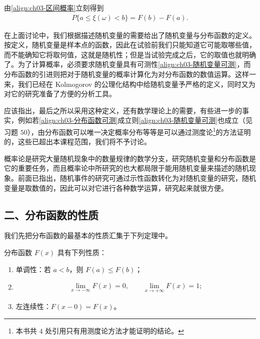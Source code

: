 \documentclass[../../main.tex]{subfiles}
\begin{document}
由\eqref{align:ch03-区间概率}立刻得到
\begin{align}
P\{a\leqslant\xi(\omega)<b\}=F(b)-F(a).\label{align:ch03-区间概率差}
\end{align}

在上面讨论中，我们根据描述随机变量的需要给出了随机变量与分布函数的定义。按定义，随机变量是样本点的函数，因此在试验前我们只能知道它可能取哪些值，而不能确知它将取何值，这就是随机性；但是当试验完成之后，它的取值也就明确了。为了计算概率，必须要求随机变量具有可测性\eqref{align:ch03-随机变量可测}，而分布函数的引进则把对于随机变量的概率计算化为对分布函数的数值运算。这样一来，我们已经在 Kolmogorov 的公理化结构中给随机变量予严格的定义，同时又为对它的研究准备了方便的分析工具。

应该指出，最后之所以采用这种定义，还有数学理论上的需要，有些进一步的事实，例如若\eqref{align:ch03-分布函数可测}成立则\eqref{align:ch03-随机变量可测}也成立（见习题 $50$），由分布函数可以唯一决定概率分布等等是可以通过测度论\footnote{本书共 $4$ 处引用只有用测度论方法才能证明的结论。}的方法证明的，这些已超出本课程范围，我们将不予讨论。

概率论是研究大量随机现象中的数量规律的数学分支，研究随机变量和分布函数是它的重要任务，而且概率论中所研究的也大都局限于能用随机变量来描述的随机现象。前面已指出，随机事件的研究可通过示性函数转化为对随机变量的研究，随机变量是取数值的，因此可以对它进行各种数学运算，研究起来就很方便。

\subsection*{二、分布函数的性质}

我们先把分布函数的最基本的性质汇集于下列定理中。

\begin{theorem}[分布函数的性质]\label{theorem:ch03-分布函数性质}
分布函数 $F(x)$ 具有下列性质：
\begin{enumerate}
\item 单调性：若 $a<b$，则 $F(a)\leqslant F(b)$；
\item \begin{align}
\lim_{x\to-\infty}F(x)=0,\qquad \lim_{x\to+\infty}F(x)=1;\label{align:ch03-分布函数极限}
\end{align}
\item 左连续性：$F(x-0)=F(x)$。
\end{enumerate}
\end{theorem}
\end{document}
